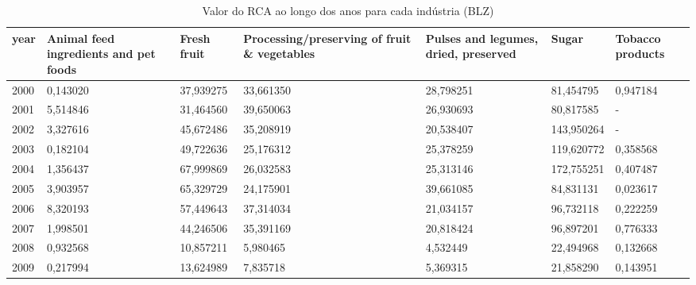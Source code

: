 \begin{table}
\centering
\caption{Valor do RCA ao longo dos anos para cada indústria (BLZ)}
\begin{tabular}{p{1cm}p{2cm}p{2cm}p{2cm}p{2cm}p{2cm}p{2cm}}
\toprule
 year &  Animal feed ingredients and pet foods &  Fresh fruit &  Processing/preserving of fruit \& vegetables &  Pulses and legumes, dried, preserved &      Sugar &  Tobacco products \\
\midrule
 2000 &                               0,143020 &    37,939275 &                                    33,661350 &                             28,798251 &  81,454795 &          0,947184 \\
 2001 &                               5,514846 &    31,464560 &                                    39,650063 &                             26,930693 &  80,817585 &                 - \\
 2002 &                               3,327616 &    45,672486 &                                    35,208919 &                             20,538407 & 143,950264 &                 - \\
 2003 &                               0,182104 &    49,722636 &                                    25,176312 &                             25,378259 & 119,620772 &          0,358568 \\
 2004 &                               1,356437 &    67,999869 &                                    26,032583 &                             25,313146 & 172,755251 &          0,407487 \\
 2005 &                               3,903957 &    65,329729 &                                    24,175901 &                             39,661085 &  84,831131 &          0,023617 \\
 2006 &                               8,320193 &    57,449643 &                                    37,314034 &                             21,034157 &  96,732118 &          0,222259 \\
 2007 &                               1,998501 &    44,246506 &                                    35,391169 &                             20,818424 &  96,897201 &          0,776333 \\
 2008 &                               0,932568 &    10,857211 &                                     5,980465 &                              4,532449 &  22,494968 &          0,132668 \\
 2009 &                               0,217994 &    13,624989 &                                     7,835718 &                              5,369315 &  21,858290 &          0,143951 \\

\end{tabular}
\end{table}
